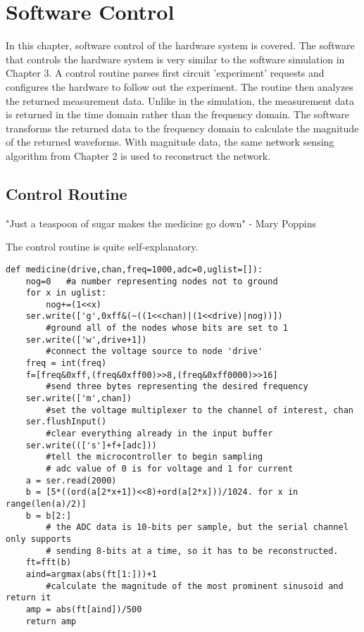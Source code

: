 \documentclass[11pt,twoside]{mitthesis}
\begin{document}
\fi

\chapter{Software Control}
In this chapter, software control of the hardware system is covered.
The software that controls the hardware system is very similar to the software simulation in Chapter 3.  
A control routine parses first circuit 'experiment' requests and configures the hardware to follow out the experiment.
The routine then analyzes the returned measurement data.
Unlike in the simulation, the measurement data is returned in the time domain rather than the frequency domain.
The software transforms the returned data to the frequency domain to calculate the magnitude of the returned waveforms.
With magnitude data, the same network sensing algorithm from Chapter 2  is used to reconstruct the network.
\section{Control Routine}

"Just a teaspoon of sugar makes the medicine go down" - Mary Poppins

The control routine is quite self-explanatory.

\begin{Verbatim}[fontsize=\footnotesize]
def medicine(drive,chan,freq=1000,adc=0,uglist=[]):
    nog=0	#a number representing nodes not to ground
    for x in uglist:
        nog+=(1<<x)
    ser.write(['g',0xff&(~((1<<chan)|(1<<drive)|nog))])	
		#ground all of the nodes whose bits are set to 1
    ser.write(['w',drive+1])
    	#connect the voltage source to node 'drive'
    freq = int(freq)
    f=[freq&0xff,(freq&0xff00)>>8,(freq&0xff0000)>>16]
    	#send three bytes representing the desired frequency
    ser.write(['m',chan])
    	#set the voltage multiplexer to the channel of interest, chan
    ser.flushInput()
    	#clear everything already in the input buffer
    ser.write((['s']+f+[adc]))
    	#tell the microcontroller to begin sampling
    	# adc value of 0 is for voltage and 1 for current
    a = ser.read(2000)
    b = [5*((ord(a[2*x+1])<<8)+ord(a[2*x]))/1024. for x in range(len(a)/2)]
    b = b[2:]
    	# the ADC data is 10-bits per sample, but the serial channel only supports
    	# sending 8-bits at a time, so it has to be reconstructed.
    ft=fft(b)
    aind=argmax(abs(ft[1:]))+1
    	#calculate the magnitude of the most prominent sinusoid and return it
    amp = abs(ft[aind])/500
    return amp
\end{Verbatim}
\end{document}

